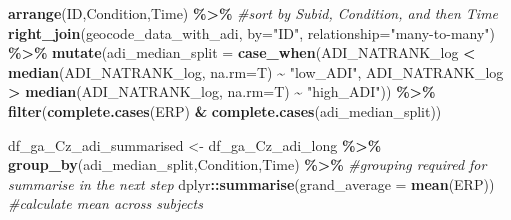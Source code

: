 \documentclass[
]{article}
\newenvironment{Shaded}{\begin{snugshade}}{\end{snugshade}}
\newcommand{\AttributeTok}[1]{\textcolor[rgb]{0.13,0.29,0.53}{#1}}
\newcommand{\CommentTok}[1]{\textcolor[rgb]{0.56,0.35,0.01}{\textit{#1}}}
\newcommand{\FunctionTok}[1]{\textcolor[rgb]{0.13,0.29,0.53}{\textbf{#1}}}
\newcommand{\NormalTok}[1]{#1}
\newcommand{\OtherTok}[1]{\textcolor[rgb]{0.56,0.35,0.01}{#1}}
\newcommand{\SpecialCharTok}[1]{\textcolor[rgb]{0.81,0.36,0.00}{\textbf{#1}}}
\newcommand{\StringTok}[1]{\textcolor[rgb]{0.31,0.60,0.02}{#1}}
\begin{document}
\begin{Shaded}
\begin{Highlighting}[]
  \FunctionTok{arrange}\NormalTok{(ID,Condition,Time) }\SpecialCharTok{\%\textgreater{}\%} \CommentTok{\#sort by Subid, Condition, and then Time}
  \FunctionTok{right\_join}\NormalTok{(geocode\_data\_with\_adi, }\AttributeTok{by=}\StringTok{"ID"}\NormalTok{, }\AttributeTok{relationship=}\StringTok{"many{-}to{-}many"}\NormalTok{) }\SpecialCharTok{\%\textgreater{}\%}
  \FunctionTok{mutate}\NormalTok{(}\AttributeTok{adi\_median\_split =} \FunctionTok{case\_when}\NormalTok{(ADI\_NATRANK\_log }\SpecialCharTok{\textless{}} \FunctionTok{median}\NormalTok{(ADI\_NATRANK\_log, }\AttributeTok{na.rm=}\NormalTok{T) }\SpecialCharTok{\textasciitilde{}} \StringTok{"low\_ADI"}\NormalTok{,}
\NormalTok{                                       ADI\_NATRANK\_log }\SpecialCharTok{\textgreater{}} \FunctionTok{median}\NormalTok{(ADI\_NATRANK\_log, }\AttributeTok{na.rm=}\NormalTok{T) }\SpecialCharTok{\textasciitilde{}} \StringTok{"high\_ADI"}\NormalTok{)) }\SpecialCharTok{\%\textgreater{}\%}
  \FunctionTok{filter}\NormalTok{(}\FunctionTok{complete.cases}\NormalTok{(ERP) }\SpecialCharTok{\&} \FunctionTok{complete.cases}\NormalTok{(adi\_median\_split))}

\NormalTok{df\_ga\_Cz\_adi\_summarised }\OtherTok{\textless{}{-}}\NormalTok{ df\_ga\_Cz\_adi\_long }\SpecialCharTok{\%\textgreater{}\%}
  \FunctionTok{group\_by}\NormalTok{(adi\_median\_split,Condition,Time) }\SpecialCharTok{\%\textgreater{}\%} \CommentTok{\#grouping required for summarise in the next step}
\NormalTok{  dplyr}\SpecialCharTok{::}\FunctionTok{summarise}\NormalTok{(}\AttributeTok{grand\_average =} \FunctionTok{mean}\NormalTok{(ERP)) }\CommentTok{\#calculate mean across subjects}


\end{Highlighting}
\end{Shaded}
\end{document}
